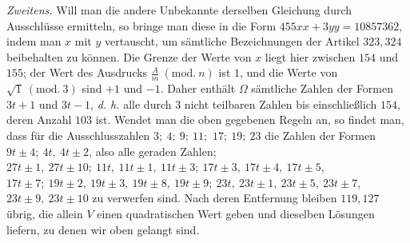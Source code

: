 \begin{samepage}
\textit{Zweitens.} Will man die andere Unbekannte derselben Gleichung durch Ausschlüsse ermitteln, so bringe man diese in die Form \(455xx+3yy=10857362\), indem man \(x\) mit \(y\) vertauscht, um sämtliche Bezeichnungen der Artikel \(323,\allowbreak 324\) beibehalten zu können. Die Grenze der Werte von \(x\) liegt hier zwischen \(154\) und \(155\); der Wert des Ausdrucks \(\frac Am\ (\mathrm{mod.}\ n)\) ist \(1\), und die Werte von \(\surd1\ (\mathrm{mod.}\ 3)\) sind \(+1\) und \(-1\). Daher enthält \(\Omega\) sämtliche Zahlen der Formen \(3t+1\) und \(3t-1\), \textit{d. h.} alle durch \(3\) nicht teilbaren Zahlen bis einschließlich \(154\), deren Anzahl \(103\) ist. Wendet man die oben gegebenen Regeln an, so findet man, dass für die Ausschlusszahlen \(3;\allowbreak \ 4;\allowbreak \ 9;\allowbreak \ 11;\allowbreak \) \(17;\allowbreak \ 19;\allowbreak \ 23\) die Zahlen der Formen \(9t\pm4;\allowbreak \ 4t,\allowbreak \ 4t\pm2\), also alle geraden Zahlen; \(27t\pm1,\allowbreak \ 27t\pm10;\allowbreak \ 11t,\allowbreak \ 11t\pm1,\allowbreak \ 11t\pm3;\allowbreak \ 17t\pm3,\allowbreak \ 17t\pm4,\allowbreak \ 17t\pm5\), \(17t\pm7;\allowbreak \ 19t\pm2,\allowbreak \ 19t\pm3,\allowbreak \ 19t\pm8,\allowbreak \ 19t\pm9;\allowbreak \ 23t,\allowbreak \ 23t\pm1,\allowbreak \ 23t\pm5,\allowbreak \ 23t\pm7\), \(23t\pm9,\allowbreak \ 23t\pm10\) zu verwerfen sind. Nach deren Entfernung bleiben \(119,\allowbreak 127\) übrig, die allein \(V\) einen quadratischen Wert geben und dieselben Lösungen liefern, zu denen wir oben gelangt sind.
\par\end{samepage}

